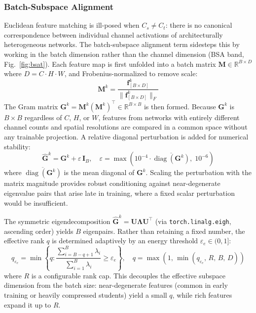 \documentclass[conference]{IEEEtran}
\begin{document}
\subsubsection{Batch-Subspace Alignment}
\par
Euclidean feature matching is ill-posed when $C_s \neq C_t$: there
is no canonical correspondence between individual channel activations
of architecturally heterogeneous networks. The batch-subspace
alignment term sidesteps this by working in the batch dimension
rather than the channel dimension (BSA band, Fig.~\ref{fig:bsat}). 
Each feature map is first unfolded into a batch 
matrix $\mathbf{M} \in \mathbb{R}^{B \times D}$ where
$D = C \cdot H \cdot W$, and Frobenius-normalized to remove scale:
\begin{equation}
    \mathbf{M}^k = \frac{\mathbf{f}^k_{[B \times D]}}
    {\|\mathbf{f}^k_{[B \times D]}\|_F}
\end{equation}
The Gram matrix $\mathbf{G}^k = \mathbf{M}^k (\mathbf{M}^k)^\top
\in \mathbb{R}^{B \times B}$ is then formed. Because $\mathbf{G}^k$
is $B \times B$ regardless of $C$, $H$, or $W$, features from
networks with entirely different channel counts and spatial
resolutions are compared in a common space without any trainable
projection. A relative diagonal perturbation is added for numerical stability:
\begin{equation}
    \hat{\mathbf{G}}^k = \mathbf{G}^k + \varepsilon\,\mathbf{I}_B,
    \quad \varepsilon = \max\!\left(10^{-4}\cdot\overline{\operatorname{diag}(\mathbf{G}^k)},\;10^{-6}\right)
\end{equation}
where $\overline{\operatorname{diag}(\mathbf{G}^k)}$ is the mean diagonal of $\mathbf{G}^k$.
Scaling the perturbation with the matrix magnitude provides robust
conditioning against near-degenerate eigenvalue pairs that arise late in
training, where a fixed scalar perturbation would be insufficient.

\par
The symmetric eigendecomposition $\hat{\mathbf{G}}^k = \mathbf{U}\boldsymbol{\Lambda}\mathbf{U}^\top$
(via \texttt{torch.linalg.eigh}, ascending order) yields $B$ eigenpairs.
Rather than retaining a fixed number, the effective rank $q$ is determined
adaptively by an energy threshold $\varepsilon_e \in (0,1]$:
\begin{equation}
    q_{\varepsilon_e} = \min\!\left\{q : \frac{\displaystyle\sum_{i=B-q+1}^{B}\lambda_i}
                                              {\displaystyle\sum_{i=1}^{B}\lambda_i}
                               \geq \varepsilon_e\right\}, \quad
    q = \max\!\left(1,\,\min(q_{\varepsilon_e},\, R,\, B,\, D)\right)
    \label{eq:energy_rank}
\end{equation}
where $R$ is a configurable rank cap. This decouples the effective subspace
dimension from the batch size: near-degenerate features (common in early
training or heavily compressed students) yield a small $q$, while rich
features expand it up to $R$.
\end{document}
